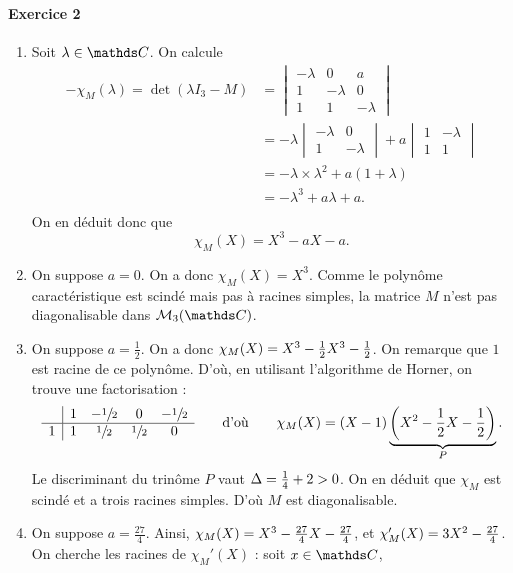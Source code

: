 \documentclass[a4paper]{article}
\begin{document}
	\paragraph{Exercice 2}
	\begin{enumerate}
		\item Soit $\lambda \in \C$. On calcule
			\begin{align*}
				-\chi_M(\lambda) = \det(\lambda I_3 - M) &= 
				\begin{vmatrix}
					-\lambda & 0 & a\\
					1 & -\lambda & 0\\
					1 & 1 & -\lambda
				\end{vmatrix}\\
				&= -\lambda
				\begin{vmatrix}
					-\lambda & 0\\
					1 & -\lambda
				\end{vmatrix} + a
				\begin{vmatrix}
					1&-\lambda\\
					1&1
				\end{vmatrix}\\
				&= -\lambda \times \lambda^2 + a (1 + \lambda) \\
				&= -\lambda^3 + a\lambda + a. \\
			\end{align*}
			On en déduit donc que \[
				\chi_M(X) = X^3 - aX - a
			.\]
		\item On suppose $a = 0$. On a donc $\chi_M(X) = X^3$. Comme le polynôme caractéristique est scindé mais pas à racines simples, la matrice $M$\/ n'est pas diagonalisable dans $\mathscr{M}_3(\C)$.
		\item On suppose $a = \frac{1}{2}$. On a donc $\textstyle\chi_M(X) = X^3 - \frac{1}{2}X^3 - \frac{1}{2}$. On remarque que $1$\/ est racine de ce polynôme. D'où, en utilisant l'algorithme de {\sc Horner}, on trouve une factorisation : \[
				\begin{array}{c|cccc}
					&1&-\sfrac{1}{2}&0&-\sfrac{1}{2}\\ \hline
					1&1&\sfrac{1}{2}&\sfrac{1}{2}&0
				\end{array}\qquad\text{d'où}\qquad \chi_M(X) = (X - 1)\underbrace{\left(X^2 - \frac{1}{2}X - \frac{1}{2}\right)}_{P}
			.\] Le discriminant du trinôme $P$\/ vaut $\textstyle\Delta = \frac{1}{4} + 2 > 0$. On en déduit que $\chi_M$\/ est scindé et a trois racines simples. D'où $M$\/ est diagonalisable.
		\item On suppose $a = \tfrac{27}{4}$. Ainsi, $\textstyle\chi_M(X) = X^3 - \frac{27}{4}X - \frac{27}{4}$, et $\textstyle \chi_M'(X) = 3X^2 - \frac{27}{4}$. On cherche les racines de $\chi_M'(X)$\/ : soit $x \in \C$,

\end{enumerate}
\end{document}
